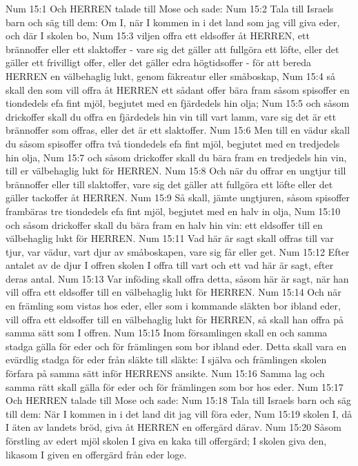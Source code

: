 Num 15:1  Och HERREN talade till Mose och sade:
Num 15:2  Tala till Israels barn och säg till dem: Om I, när I kommen in i det land som jag vill giva eder, och där I skolen bo,
Num 15:3  viljen offra ett eldsoffer åt HERREN, ett brännoffer eller ett slaktoffer - vare sig det gäller att fullgöra ett löfte, eller det gäller ett frivilligt offer, eller det gäller edra högtidsoffer - för att bereda HERREN en välbehaglig lukt, genom fäkreatur eller småboskap,
Num 15:4  så skall den som vill offra åt HERREN ett sådant offer bära fram såsom spisoffer en tiondedels efa fint mjöl, begjutet med en fjärdedels hin olja;
Num 15:5  och såsom drickoffer skall du offra en fjärdedels hin vin till vart lamm, vare sig det är ett brännoffer som offras, eller det är ett slaktoffer.
Num 15:6  Men till en vädur skall du såsom spisoffer offra två tiondedels efa fint mjöl, begjutet med en tredjedels hin olja,
Num 15:7  och såsom drickoffer skall du bära fram en tredjedels hin vin, till er välbehaglig lukt för HERREN.
Num 15:8  Och när du offrar en ungtjur till brännoffer eller till slaktoffer, vare sig det gäller att fullgöra ett löfte eller det gäller tackoffer åt HERREN.
Num 15:9  Så skall, jämte ungtjuren, såsom spisoffer frambäras tre tiondedels efa fint mjöl, begjutet med en halv in olja,
Num 15:10  och såsom drickoffer skall du bära fram en halv hin vin: ett eldsoffer till en välbehaglig lukt för HERREN.
Num 15:11  Vad här är sagt skall offras till var tjur, var vädur, vart djur av småboskapen, vare sig får eller get.
Num 15:12  Efter antalet av de djur I offren skolen I offra till vart och ett vad här är sagt, efter deras antal.
Num 15:13  Var inföding skall offra detta, såsom här är sagt, när han vill offra ett eldsoffer till en välbehaglig lukt för HERREN.
Num 15:14  Och när en främling som vistas hos eder, eller som i kommande släkten bor ibland eder, vill offra ett eldsoffer till en välbehaglig lukt för HERREN, så skall han offra på samma sätt som I offren.
Num 15:15  Inom församlingen skall en och samma stadga gälla för eder och för främlingen som bor ibland eder. Detta skall vara en evärdlig stadga för eder från släkte till släkte: I själva och främlingen skolen förfara på samma sätt inför HERRENS ansikte.
Num 15:16  Samma lag och samma rätt skall gälla för eder och för främlingen som bor hos eder.
Num 15:17  Och HERREN talade till Mose och sade:
Num 15:18  Tala till Israels barn och säg till dem: När I kommen in i det land dit jag vill föra eder,
Num 15:19  skolen I, då I äten av landets bröd, giva åt HERREN en offergärd därav.
Num 15:20  Såsom förstling av edert mjöl skolen I giva en kaka till offergärd; I skolen giva den, likasom I given en offergärd från eder loge.
